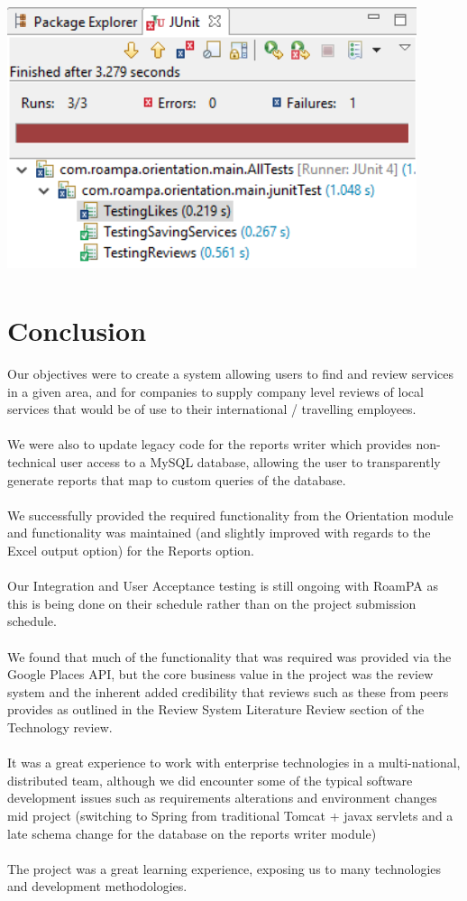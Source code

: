 \begin{center}    
	\includegraphics[height=8cm, width=12cm]{img/junit.png}
\end{center}

\chapter{Conclusion}
Our objectives were to create a system allowing users to find and review services in a given area, and for companies to supply company level reviews of local services that would be of use to their international / travelling employees.\\\\
We were also to update legacy code for the reports writer which provides non-technical user access to a MySQL database, allowing the user to transparently generate reports that map to custom queries of the database.\\\\
We successfully provided the required functionality from the Orientation module and functionality was maintained (and slightly improved with regards to the Excel output option) for the Reports option.\\\\
Our Integration and User Acceptance testing is still ongoing with RoamPA as this is being done on their schedule rather than on the project submission schedule.\\\\
We found that much of the functionality that was required was provided via the Google Places API, but the core business value in the project was the review system and the inherent added credibility that reviews such as these from peers provides as outlined in the Review System Literature Review section of the Technology review.\\\\
It was a great experience to work with enterprise technologies in a multi-national, distributed team, although we did encounter some of the typical software development issues such as requirements alterations and environment changes mid project (switching to Spring from traditional Tomcat + javax servlets and a late schema change for the database on the reports writer module) \\\\
The project was a great learning experience, exposing us to many technologies and development methodologies.

